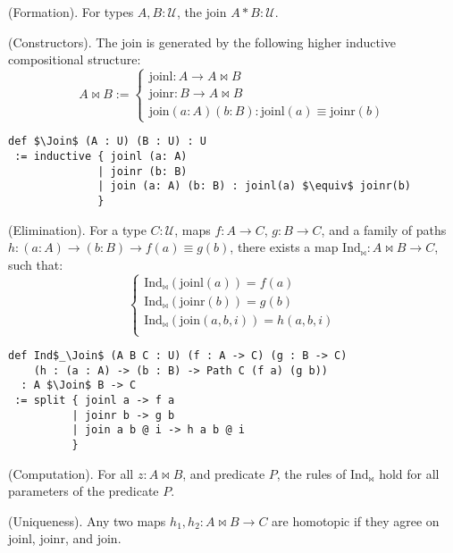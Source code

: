 \begin{definition} (Formation).
For types \( A, B : \mathcal{U} \), the join \( A * B : \mathcal{U} \).
\end{definition}

\begin{definition} (Constructors).
The join is generated by the following higher inductive compositional structure:
\[
A \Join B :=
\begin{cases}
\text{joinl} : A \to A \Join B \\
\text{joinr} : B \to A \Join B \\
\text{join} (a : A) (b : B) : \text{joinl}(a) \equiv \text{joinr}(b)
\end{cases}
\]
\begin{lstlisting}[mathescape=true]
def $\Join$ (A : U) (B : U) : U
 := inductive { joinl (a: A)
              | joinr (b: B)
              | join (a: A) (b: B) : joinl(a) $\equiv$ joinr(b)
              }
\end{lstlisting}
\end{definition}

\begin{theorem} (Elimination).
For a type \( C : \mathcal{U} \), maps \( f : A \to C \), \( g : B \to C \),
and a family of paths \( h : (a : A) \to (b : B) \to f(a) \equiv g(b) \),
there exists a map \( \text{Ind}_\Join : A \Join B \to C \), such that:
\[
\begin{cases}
\text{Ind}_\Join(\text{joinl}(a)) = f(a) \\
\text{Ind}_\Join(\text{joinr}(b)) = g(b) \\
\text{Ind}_\Join(\text{join}(a,b,i)) = h(a,b,i) \\
\end{cases}
\]
\begin{lstlisting}[mathescape=true]
def Ind$_\Join$ (A B C : U) (f : A -> C) (g : B -> C)
    (h : (a : A) -> (b : B) -> Path C (f a) (g b))
  : A $\Join$ B -> C
 := split { joinl a -> f a
          | joinr b -> g b
          | join a b @ i -> h a b @ i
          }
\end{lstlisting}
\end{theorem}

\begin{theorem} (Computation).
For all \( z : A \Join B \), and predicate \( P \), the rules of \( \text{Ind}_\Join \) hold for all parameters of the predicate \( P \).
\end{theorem}

\begin{theorem} (Uniqueness).
Any two maps \( h_1, h_2 : A \Join B \to C \) are homotopic
if they agree on \( \text{joinl} \), \( \text{joinr} \), and \( \text{join} \).
\end{theorem}

